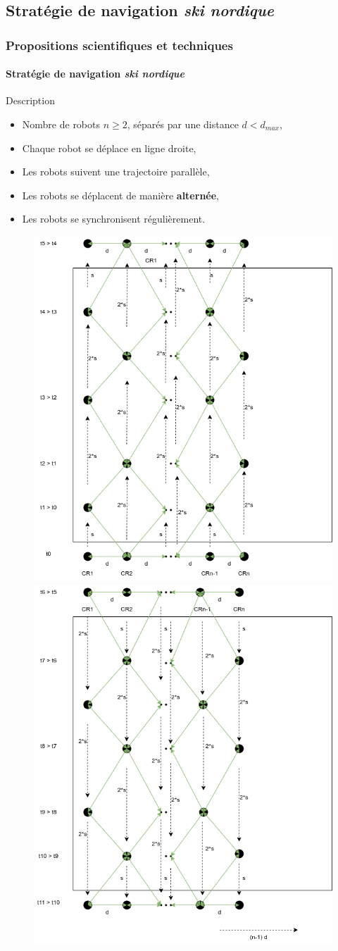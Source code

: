 \documentclass{beamer}
\newcommand{\compresslist}{\setlength{\itemsep}{0pt}\setlength{\parskip}{1pt}\setlength{\parsep}{0pt}}
\begin{document}
		\subsection{Stratégie de navigation \textit{ski nordique}}
			\begin{frame}
				\frametitle{Propositions scientifiques et techniques}
				\framesubtitle{Stratégie de navigation \textit{ski nordique}}
				\vspace{-5pt}
				\tiny
				\begin{block}{Description}
				\begin{itemize}\compresslist
						\item Nombre de robots $n \ge 2$, séparés par une distance $d < d_{max}$,
						\item Chaque robot se déplace en ligne droite,
						\item Les robots suivent une trajectoire parallèle,
						\item Les robots se déplacent de manière \textbf{alternée},
						\item Les robots se synchronisent régulièrement.
					\end{itemize}
				\end{block}
				\vspace{-5pt}
				\begin{figure}
					\centering
					\includegraphics[width=0.35\linewidth]{graphics/ski_nordique_1.png}
					\includegraphics[width=0.35\linewidth]{graphics/ski_nordique_2.png}
				\end{figure}
			\end{frame}
\end{document}
